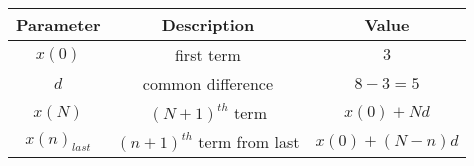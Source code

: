 \begin{tabular}{|c|c|c|}
        \hline
        \textbf{Parameter} & \textbf{Description} & \textbf{Value} \\
        \hline
        $x(0)$ & first term  & $3$ \\
         \hline
        $d$ & common difference & $8 - 3 = 5$ \\
        \hline
        $x(N)$ & $(N+1)^{th}$ term&$x(0) + Nd$\\
        \hline
        $x(n)_{last}$&$(n+1)^{th}$ term from last & $x(0)+(N-n)d$\\
        \hline
    \end{tabular}
